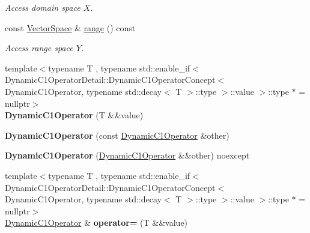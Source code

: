 \begin{DoxyCompactItemize}
\begin{DoxyCompactList}\small\item\em Access domain space $X$. \end{DoxyCompactList}\item 
const \hyperlink{classSpacy_1_1VectorSpace}{Vector\+Space} \& \hyperlink{classSpacy_1_1DynamicC1Operator_a15daaabb27566457a0a3df02a13f9d96}{range} () const \hypertarget{classSpacy_1_1DynamicC1Operator_a15daaabb27566457a0a3df02a13f9d96}{}\label{classSpacy_1_1DynamicC1Operator_a15daaabb27566457a0a3df02a13f9d96}

\begin{DoxyCompactList}\small\item\em Access range space $Y$. \end{DoxyCompactList}\item 
{\footnotesize template$<$typename T , typename std\+::enable\+\_\+if$<$ Dynamic\+C1\+Operator\+Detail\+::\+Dynamic\+C1\+Operator\+Concept$<$ Dynamic\+C1\+Operator, typename std\+::decay$<$ T $>$\+::type $>$\+::value $>$\+::type $\ast$  = nullptr$>$ }\\{\bfseries Dynamic\+C1\+Operator} (T \&\&value)\hypertarget{classSpacy_1_1DynamicC1Operator_a9eeca088eb41c043b63c4b583f56d5ff}{}\label{classSpacy_1_1DynamicC1Operator_a9eeca088eb41c043b63c4b583f56d5ff}

\item 
{\bfseries Dynamic\+C1\+Operator} (const \hyperlink{classSpacy_1_1DynamicC1Operator}{Dynamic\+C1\+Operator} \&other)\hypertarget{classSpacy_1_1DynamicC1Operator_a9df9aeab7bcd5710f379516fa8f7772d}{}\label{classSpacy_1_1DynamicC1Operator_a9df9aeab7bcd5710f379516fa8f7772d}

\item 
{\bfseries Dynamic\+C1\+Operator} (\hyperlink{classSpacy_1_1DynamicC1Operator}{Dynamic\+C1\+Operator} \&\&other) noexcept\hypertarget{classSpacy_1_1DynamicC1Operator_a0a5cb4d86215d268560bebcf89e8fc42}{}\label{classSpacy_1_1DynamicC1Operator_a0a5cb4d86215d268560bebcf89e8fc42}

\item 
{\footnotesize template$<$typename T , typename std\+::enable\+\_\+if$<$ Dynamic\+C1\+Operator\+Detail\+::\+Dynamic\+C1\+Operator\+Concept$<$ Dynamic\+C1\+Operator, typename std\+::decay$<$ T $>$\+::type $>$\+::value $>$\+::type $\ast$  = nullptr$>$ }\\\hyperlink{classSpacy_1_1DynamicC1Operator}{Dynamic\+C1\+Operator} \& {\bfseries operator=} (T \&\&value)\hypertarget{classSpacy_1_1DynamicC1Operator_a30da03500f47757230e26cd0eb5a684b}{}\label{classSpacy_1_1DynamicC1Operator_a30da03500f47757230e26cd0eb5a684b}


\end{DoxyCompactItemize}
